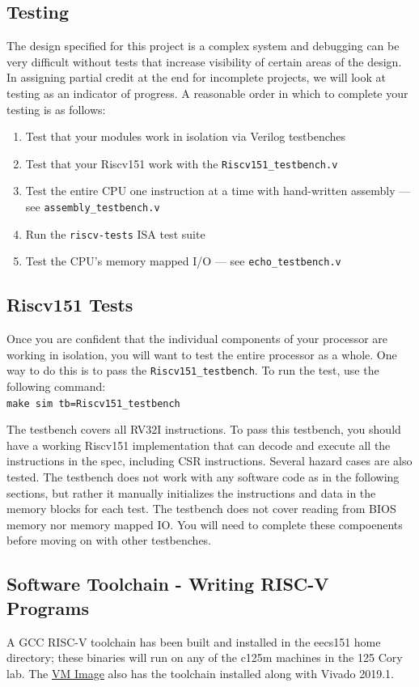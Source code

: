 \documentclass[11pt]{article}
\begin{document}
\subsection{Testing}
\label{testing}
The design specified for this project is a complex system and debugging can be very difficult without tests that increase visibility of certain areas of the design.
In assigning partial credit at the end for incomplete projects, we will look at testing as an indicator of progress.
A reasonable order in which to complete your testing is as follows:

\begin{enumerate}
  \item Test that your modules work in isolation via Verilog testbenches
  \item Test that your Riscv151 work with the \verb|Riscv151_testbench.v|
  \item Test the entire CPU one instruction at a time with hand-written assembly --- see \verb|assembly_testbench.v|
  \item Run the \verb|riscv-tests| ISA test suite
  \item Test the CPU's memory mapped I/O --- see \verb|echo_testbench.v|
\end{enumerate}

\subsection{Riscv151 Tests}

Once you are confident that the individual components of your processor are working in isolation, you will want to test the entire processor as a whole. One way to do this is to pass the \verb|Riscv151_testbench|. To run the test, use the following command:\\
\verb|make sim tb=Riscv151_testbench|

The testbench covers all RV32I instructions. To pass this testbench, you should have a working Riscv151 implementation that can decode and execute all the instructions in the spec, including CSR instructions. Several hazard cases are also tested. The testbench does not work with any software code as in the following sections, but rather it manually initializes the instructions and data in the memory blocks for each test. The testbench does not cover reading from BIOS memory nor memory mapped IO. You will need to complete these compoenents before moving on with other testbenches.

\subsection{Software Toolchain - Writing RISC-V Programs}
\label{toolchain}
A GCC RISC-V toolchain has been built and installed in the eecs151 home directory; these binaries will run on any of the c125m machines in the 125 Cory lab. The \href{https://berkeley.box.com/s/s4z0ykpf0tudrm9hce8fsmitpgb2khhe}{VM Image} also has the toolchain installed along with Vivado 2019.1.
\end{document}
